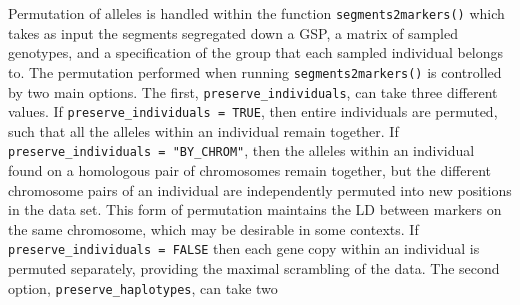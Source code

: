 Permutation of alleles is handled within the \gscramble{} function {\footnotesize\tt segments2markers()}
which takes as input the segments segregated down a GSP, a matrix of sampled genotypes, and a specification
of the group that each sampled individual belongs to.  The permutation performed when running
{\footnotesize\tt segments2markers()} is controlled by two main options.  The first, {\tt\footnotesize preserve\_individuals},
can take three different values.  If {\tt\footnotesize preserve\_individuals = TRUE}, then entire individuals are permuted,
such that all the alleles within an individual remain together.  If {\tt\footnotesize preserve\_individuals = "BY\_CHROM"}, then
the alleles within an individual found on a homologous pair of chromosomes remain together, but the different
chromosome pairs of an individual are independently permuted into new positions in the data set.  This form of permutation
maintains the LD between markers on the same chromosome, which may be desirable in some contexts.
If {\tt\footnotesize preserve\_individuals = FALSE} then each gene copy within an individual is permuted separately,
providing the maximal scrambling of the data.   The second option, {\tt\footnotesize preserve\_haplotypes}, can take two
